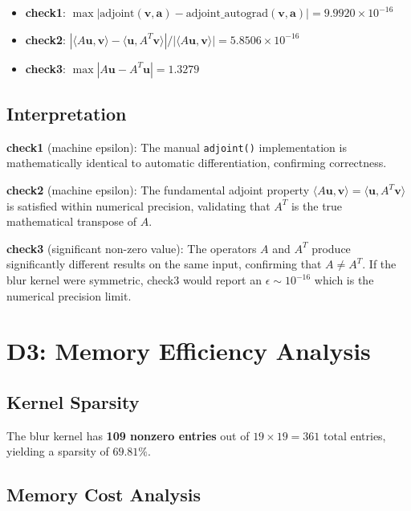 \documentclass[12pt]{article}
\begin{document}
\begin{itemize}
    \item \textbf{check1}: $\max|\text{adjoint}(\mathbf{v}, \mathbf{a}) - \text{adjoint\_autograd}(\mathbf{v}, \mathbf{a})| = 9.9920 \times 10^{-16}$
    \item \textbf{check2}: $\left|\langle A\mathbf{u}, \mathbf{v} \rangle - \langle \mathbf{u}, A^T\mathbf{v} \rangle\right| / |\langle A\mathbf{u}, \mathbf{v} \rangle| = 5.8506 \times 10^{-16}$
    \item \textbf{check3}: $\max|A\mathbf{u} - A^T\mathbf{u}| = 1.3279$
\end{itemize}

\subsection*{Interpretation}

\textbf{check1} (machine epsilon): The manual \texttt{adjoint()} implementation is mathematically identical to automatic differentiation, confirming correctness.

\textbf{check2} (machine epsilon): The fundamental adjoint property $\langle A\mathbf{u}, \mathbf{v} \rangle = \langle \mathbf{u}, A^T\mathbf{v} \rangle$ is satisfied within numerical precision, validating that $A^T$ is the true mathematical transpose of $A$.

\textbf{check3} (significant non-zero value): The operators $A$ and $A^T$ produce significantly different results on the same input, confirming that $A \neq A^T$. If the blur kernel were symmetric, check3 would report an $\epsilon \sim 10^{-16}$ which is the numerical precision limit.

\section*{D3: Memory Efficiency Analysis}

\subsection*{Kernel Sparsity}

The blur kernel has \textbf{109 nonzero entries} out of $19 \times 19 = 361$ total entries, yielding a sparsity of $69.81\%$.

\subsection*{Memory Cost Analysis}
\end{document}
